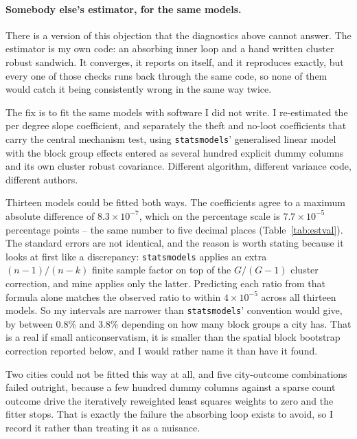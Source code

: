 \documentclass[12pt,letterpaper]{article}
\begin{document}
\paragraph{Somebody else's estimator, for the same models.} There is a version of
this objection that the diagnostics above cannot answer. The estimator is my own
code: an absorbing inner loop and a hand written cluster robust sandwich. It
converges, it reports on itself, and it reproduces exactly, but every one of those
checks runs back through the same code, so none of them would catch it being
consistently wrong in the same way twice.

The fix is to fit the same models with software I did not write. I re-estimated the
per degree slope coefficient, and separately the theft and no-loot coefficients that
carry the central mechanism test, using \texttt{statsmodels}' generalised linear
model with the block group effects entered as several hundred explicit dummy columns
and its own cluster robust covariance. Different algorithm, different variance code,
different authors.

Thirteen models could be fitted both ways. The coefficients agree to a maximum
absolute difference of $8.3\times10^{-7}$, which on the percentage scale is
$7.7\times10^{-5}$ percentage points -- the same number to five decimal places
(Table~\ref{tab:estval}). The standard errors are not identical, and the reason is
worth stating because it looks at first like a discrepancy: \texttt{statsmodels}
applies an extra $(n-1)/(n-k)$ finite sample factor on top of the $G/(G-1)$ cluster
correction, and mine applies only the latter. Predicting each ratio from that formula
alone matches the observed ratio to within $4\times10^{-5}$ across all thirteen
models. So my intervals are narrower than \texttt{statsmodels}' convention would
give, by between 0.8\% and 3.8\% depending on how many block groups a city has. That
is a real if small anticonservatism, it is smaller than the spatial block bootstrap
correction reported below, and I would rather name it than have it found.

Two cities could not be fitted this way at all, and five city-outcome combinations
failed outright, because a few hundred dummy columns against a sparse count outcome
drive the iteratively reweighted least squares weights to zero and the fitter stops.
That is exactly the failure the absorbing loop exists to avoid, so I record it rather
than treating it as a nuisance.
\end{document}
